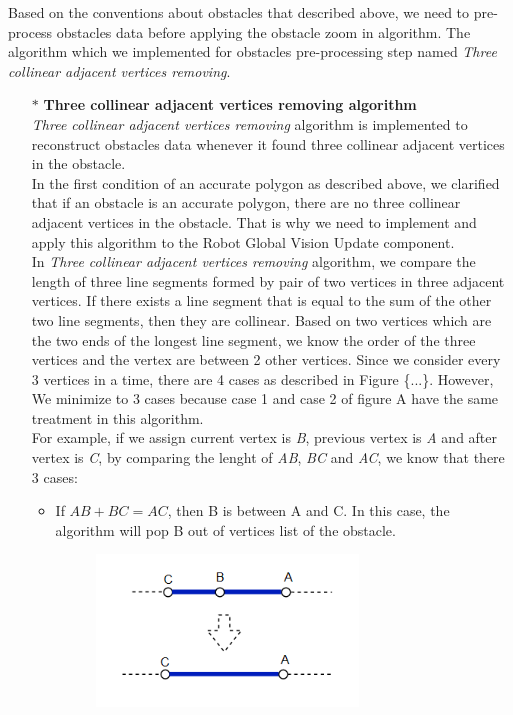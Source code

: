 \documentclass[13pt,a4paper]{article}
\begin{document}
			Based on the conventions about obstacles that described above, we need to pre-process obstacles data before applying the obstacle zoom in algorithm. The algorithm which we implemented for obstacles pre-processing step named \textit{Three collinear adjacent vertices removing}.
			
			\begin{itemize}
				\item[$\ast$] \textbf{Three collinear adjacent vertices removing algorithm}\\
				\textit{Three collinear adjacent vertices removing} algorithm is implemented to reconstruct obstacles data whenever it found three collinear adjacent vertices in the obstacle.\\
				In the first condition of an accurate polygon as described above, we clarified that if an obstacle is an accurate polygon, there are no three collinear adjacent vertices in the obstacle. That is why we need to implement and apply this algorithm to the Robot Global Vision Update component.\\
				In \textit{Three collinear adjacent vertices removing} algorithm, we compare the length of three line segments formed by pair of two vertices in three adjacent vertices. If there exists a line segment that is equal to the sum of the other two line segments, then they are collinear. Based on two vertices which are the two ends of the longest line segment, we know the order of the three vertices and the vertex are between 2 other vertices. Since we consider every 3 vertices in a time, there are 4 cases as described in Figure \{...\}. However, We minimize to 3 cases because case 1 and case 2 of figure A have the same treatment in this algorithm.\\
				For example, if we assign current vertex is \textit{B}, previous vertex is \textit{A} and after vertex is \textit{C}, by comparing the lenght of \textit{AB}, \textit{BC} and \textit{AC}, we know that there 3 cases:
				\begin{itemize}
					\item If $AB + BC = AC$, then B is between A and C. In this case, the algorithm will pop B out of vertices list of the obstacle. \\
					\begin{figure}[!h]
						\centering                                 \includegraphics[width=0.7\textwidth]{Robot_Global_Vision_Update/RGVU_preprocess_case1.png}

\end{figure}
\end{itemize}
\end{itemize}
\end{document}
